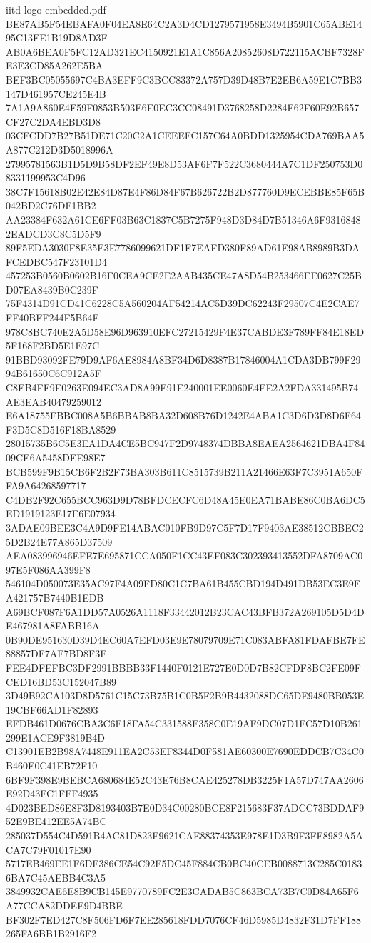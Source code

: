 \begin{filecontents*}[overwrite]{iitd-logo-embedded.pdf}
BE87AB5F54EBAFA0F04EA8E64C2A3D4CD1279571958E3494B5901C65ABE1495C13FE1B19D8AD3F
AB0A6BEA0F5FC12AD321EC4150921E1A1C856A20852608D722115ACBF7328FE3E3CD85A262E5BA
BEF3BC05055697C4BA3EFF9C3BCC83372A757D39D48B7E2EB6A59E1C7BB3147D461957CE245E4B
7A1A9A860E4F59F0853B503E6E0EC3CC08491D3768258D2284F62F60E92B657CF27C2DA4EBD3D8
03CFCDD7B27B51DE71C20C2A1CEEEFC157C64A0BDD1325954CDA769BAA5A877C212D3D5018996A
27995781563B1D5D9B58DF2EF49E8D53AF6F7F522C3680444A7C1DF250753D08331199953C4D96
38C7F15618B02E42E84D87E4F86D84F67B626722B2D877760D9ECEBBE85F65B042BD2C76DF1BB2
AA23384F632A61CE6FF03B63C1837C5B7275F948D3D84D7B51346A6F93168482EADCD3C8C5D5F9
89F5EDA3030F8E35E3E7786099621DF1F7EAFD380F89AD61E98AB8989B3DAFCEDBC547F23101D4
457253B0560B0602B16F0CEA9CE2E2AAB435CE47A8D54B253466EE0627C25BD07EA8439B0C239F
75F4314D91CD41C6228C5A560204AF54214AC5D39DC62243F29507C4E2CAE7FF40BFF244F5B64F
978C8BC740E2A5D58E96D963910EFC27215429F4E37CABDE3F789FF84E18ED5F168F2BD5E1E97C
91BBD93092FE79D9AF6AE8984A8BF34D6D8387B17846004A1CDA3DB799F2994B61650C6C912A5F
C8EB4FF9E0263E094EC3AD8A99E91E240001EE0060E4EE2A2FDA331495B74AE3EAB40479259012
E6A18755FBBC008A5B6BBAB8BA32D608B76D1242E4ABA1C3D6D3D8D6F64F3D5C8D516F18BA8529
28015735B6C5E3EA1DA4CE5BC947F2D9748374DBBA8EAEA2564621DBA4F8409CE6A5458DEE98E7
BCB599F9B15CB6F2B2F73BA303B611C8515739B211A21466E63F7C3951A650FFA9A64268597717
C4DB2F92C655BCC963D9D78BFDCECFC6D48A45E0EA71BABE86C0BA6DC5ED1919123E17E6E07934
3ADAE09BEE3C4A9D9FE14ABAC010FB9D97C5F7D17F9403AE38512CBBEC25D2B24E77A865D37509
AEA083996946EFE7E695871CCA050F1CC43EF083C302393413552DFA8709AC097E5F086AA399F8
546104D050073E35AC97F4A09FD80C1C7BA61B455CBD194D491DB53EC3E9EA421757B7440B1EDB
A69BCF087F6A1DD57A0526A1118F33442012B23CAC43BFB372A269105D5D4DE467981A8FABB16A
0B90DE951630D39D4EC60A7EFD03E9E78079709E71C083ABFA81FDAFBE7FE88857DF7AF7BD8F3F
FEE4DFEFBC3DF2991BBBB33F1440F0121E727E0D0D7B82CFDF8BC2FE09FCED16BD53C152047B89
3D49B92CA103D8D5761C15C73B75B1C0B5F2B9B4432088DC65DE9480BB053E19CBF66AD1F82893
EFDB461D0676CBA3C6F18FA54C331588E358C0E19AF9DC07D1FC57D10B261299E1ACE9F3819B4D
C13901EB2B98A7448E911EA2C53EF8344D0F581AE60300E7690EDDCB7C34C0B460E0C41EB72F10
6BF9F398E9BEBCA680684E52C43E76B8CAE425278DB3225F1A57D747AA2606E92D43FC1FFF4935
4D023BED86E8F3D8193403B7E0D34C00280BCE8F215683F37ADCC73BDDAF952E9BE412EE5A74BC
285037D554C4D591B4AC81D823F9621CAE88374353E978E1D3B9F3FF8982A5ACA7C79F01017E90
5717EB469EE1F6DF386CE54C92F5DC45F884CB0BC40CEB0088713C285C01836BA7C45AEBB4C3A5
3849932CAE6E8B9CB145E9770789FC2E3CADAB5C863BCA73B7C0D84A65F6A77CCA82DDEE9D4BBE
BF302F7ED427C8F506FD6F7EE285618FDD7076CF46D5985D4832F31D7FF188265FA6BB1B2916F2

\end{filecontents*}
